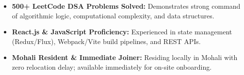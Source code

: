 \documentclass[a4paper,10pt]{article}
\begin{document}
\begin{itemize}

    \item \textbf{500+ LeetCode DSA Problems Solved:} Demonstrates strong command of algorithmic logic, computational complexity, and data structures.

    \item \textbf{React.js \& JavaScript Proficiency:} Experienced in state management (Redux/Flux), Webpack/Vite build pipelines, and REST APIs.

    \item \textbf{Mohali Resident \& Immediate Joiner:} Residing locally in Mohali with zero relocation delay; available immediately for on-site onboarding.

\end{itemize}

\end{document}
